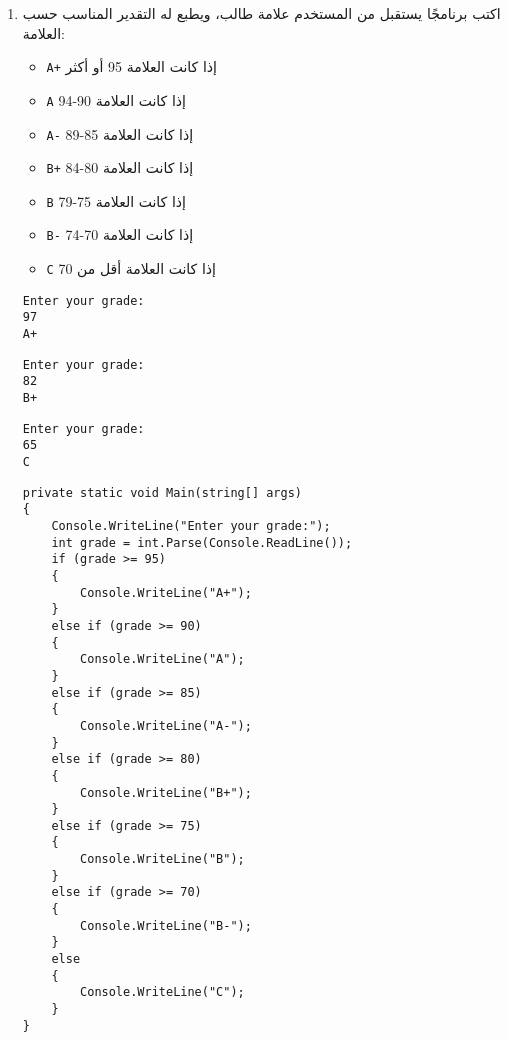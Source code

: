 \documentclass[12pt, twoside]{article}
\begin{document}
\begin{enumerate}[itemsep=3em]
\begin{enumerate}
\item
اكتب برنامجًا يستقبل من المستخدم علامة طالب، ويطبع له التقدير المناسب حسب العلامة:
\begin{itemize}
\item \texttt{A+} إذا كانت العلامة 95 أو أكثر
\item \texttt{A} إذا كانت العلامة 90-94
\item \texttt{A-} إذا كانت العلامة 85-89
\item \texttt{B+} إذا كانت العلامة 80-84
\item \texttt{B} إذا كانت العلامة 75-79
\item \texttt{B-} إذا كانت العلامة 70-74
\item \texttt{C} إذا كانت العلامة أقل من 70
\end{itemize}%
\ifdetailed
\begin{boxExample}[1]
\begin{english}
\begin{verbatim}
Enter your grade:
97
A+
\end{verbatim}
\end{english}
\end{boxExample}
\begin{boxExample}[2]
\begin{english}
\begin{verbatim}
Enter your grade:
82
B+
\end{verbatim}
\end{english}
\end{boxExample}
\begin{boxExample}[3]
\begin{english}
\begin{verbatim}
Enter your grade:
65
C
\end{verbatim}
\end{english}
\end{boxExample}

\ifwithsols
\begin{boxSolution}
\begin{english}
\begin{verbatim}
private static void Main(string[] args)
{
    Console.WriteLine("Enter your grade:");
    int grade = int.Parse(Console.ReadLine());
    if (grade >= 95)
    {
        Console.WriteLine("A+");
    }
    else if (grade >= 90)
    {
        Console.WriteLine("A");
    }
    else if (grade >= 85)
    {
        Console.WriteLine("A-");
    }
    else if (grade >= 80)
    {
        Console.WriteLine("B+");
    }
    else if (grade >= 75)
    {
        Console.WriteLine("B");
    }
    else if (grade >= 70)
    {
        Console.WriteLine("B-");
    }
    else
    {
        Console.WriteLine("C");
    }
}
\end{verbatim}
\end{english}
\end{boxSolution}
\clearpage
\fi
\fi


\end{enumerate}
\end{enumerate}
\end{document}
